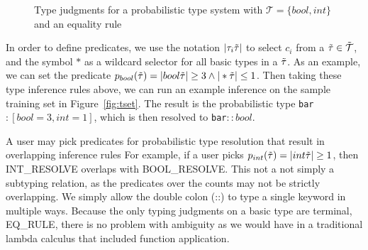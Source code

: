{
\setlength{\abovecaptionskip}{-.05pt}
\setlength{\belowcaptionskip}{-15pt}
\begin{figure}
\caption{Type judgments for a probabilistic type system with $\mathcal{T} = \{bool,int\}$ and an equality rule}
\label{fig:ptypes}
\end{figure}
}

In order to define predicates, we use the notation $|\tau_i\tilde{\tau}|$ to select $c_i$ from a $\tilde{\tau} \in \tilde{\mathcal{T}}$, 
  and the symbol $*$ as a wildcard selector for all basic types in a $\tilde{\tau}$.
As an example, we can set the predicate $p_{bool}(\tilde{\tau})= |bool\tilde{\tau}| \geq 3 \land |\ast\tilde{\tau}| \leq 1$.
Then taking these type inference rules above, we can run an example inference on the sample training set in Figure~\ref{fig:tset}.
The result is the probabilistic type \texttt{bar}$:[bool=3,int=1]$, which is then resolved to \texttt{bar}$::bool$.
 
A user may pick predicates for probabilistic type resolution that result in overlapping inference rules
For example, if a user picks $p_{int}(\tilde{\tau})= |int\tilde{\tau}| \geq 1$, then {\scriptsize INT\_RESOLVE} overlaps with {\scriptsize BOOL\_RESOLVE}.
This not a not simply a subtyping relation, as the predicates over the counts may not be strictly overlapping.
We simply allow the double colon (::) to type a single keyword in multiple ways.
Because the only typing judgments on a basic type are terminal, {\scriptsize EQ\_RULE}, there is no problem with ambiguity as we would have in a traditional lambda calculus that included function application.

